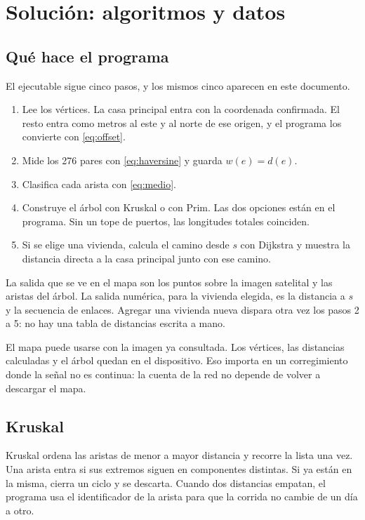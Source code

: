 \documentclass[12pt,a4paper]{article}
\begin{document}
\section{Solución: algoritmos y datos}

\subsection{Qué hace el programa}

El ejecutable sigue cinco pasos, y los mismos cinco aparecen en este documento.

\begin{enumerate}
  \item Lee los vértices. La casa principal entra con la coordenada confirmada. El resto entra como metros al este y al norte de ese origen, y el programa los convierte con \eqref{eq:offset}.
  \item Mide los 276 pares con \eqref{eq:haversine} y guarda \(w(e) = d(e)\).
  \item Clasifica cada arista con \eqref{eq:medio}.
  \item Construye el árbol con Kruskal o con Prim. Las dos opciones están en el programa. Sin un tope de puertos, las longitudes totales coinciden.
  \item Si se elige una vivienda, calcula el camino desde \(s\) con Dijkstra y muestra la distancia directa a la casa principal junto con ese camino.
\end{enumerate}

La salida que se ve en el mapa son los puntos sobre la imagen satelital y las aristas del árbol. La salida numérica, para la vivienda elegida, es la distancia a \(s\) y la secuencia de enlaces. Agregar una vivienda nueva dispara otra vez los pasos 2 a 5: no hay una tabla de distancias escrita a mano.

El mapa puede usarse con la imagen ya consultada. Los vértices, las distancias calculadas y el árbol quedan en el dispositivo. Eso importa en un corregimiento donde la señal no es continua: la cuenta de la red no depende de volver a descargar el mapa.

\subsection{Kruskal}

Kruskal ordena las aristas de menor a mayor distancia y recorre la lista una vez. Una arista entra si sus extremos siguen en componentes distintas. Si ya están en la misma, cierra un ciclo y se descarta. Cuando dos distancias empatan, el programa usa el identificador de la arista para que la corrida no cambie de un día a otro.
\end{document}
